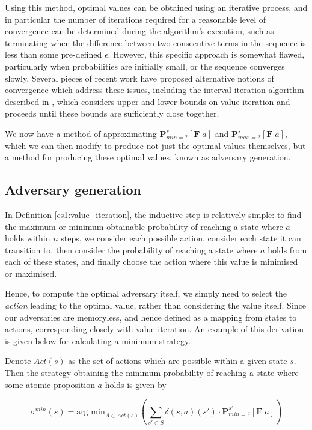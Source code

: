Using this method, optimal values can be obtained using an iterative process, and in particular the number of iterations required for a reasonable level of convergence can be determined during the algorithm's execution, such as terminating when the difference between two consecutive terms in the sequence is less than some pre-defined $\epsilon$. However, this specific approach is somewhat flawed, particularly when probabilities are initially small, or the sequence converges slowly. Several pieces of recent work have proposed alternative notions of convergence which address these issues, including the interval iteration algorithm described in \cite{haddad_interval_2018}, which considers upper and lower bounds on value iteration and proceeds until these bounds are sufficiently close together.

We now have a method of approximating $\mathbf{P}^{s}_{min =?} [\mathbf{F} \; a]$ and $\mathbf{P}^{s}_{max =?} [\mathbf{F} \; a]$, which we can then modify to produce not just the optimal values themselves, but a method for producing these optimal values, known as adversary generation.

\subsection{Adversary generation}
\label{cs1:adversary_gen}

In Definition \ref{cs1:value_iteration}, the inductive step is relatively simple: to find the maximum or minimum obtainable probability of reaching a state where $a$ holds within $n$ steps, we consider each possible action, consider each state it can transition to, then consider the probability of reaching a state where $a$ holds from each of these states, and finally choose the action where this value is minimised or maximised.

Hence, to compute the optimal adversary itself, we simply need to select the \emph{action} leading to the optimal value, rather than considering the value itself. Since our adversaries are memoryless, and hence defined as a mapping from states to actions, corresponding closely with value iteration. An example of this derivation is given below for calculating a minimum strategy.

\begin{definition}
\label{cs1:min_adv_generation}

Denote $Act(s)$ as the set of actions which are possible within a given state $s$. Then the strategy obtaining the minimum probability of reaching a state where some atomic proposition $a$ holds is given by

\begin{equation*}
    \sigma^{min}(s) = \text{arg min}_{A \in Act(s)} \left( \sum_{s' \in S} \delta(s, a)(s') \cdot \mathbf{P}^{s'}_{min =?} [\mathbf{F} \; a]\right)
\end{equation*}

\end{definition}

